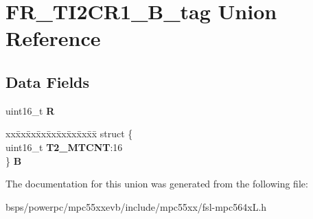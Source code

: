 \hypertarget{unionFR__TI2CR1__16B__tag}{}\section{F\+R\+\_\+\+T\+I2\+C\+R1\+\_\+B\+\_\+tag Union Reference}
\label{unionFR__TI2CR1__16B__tag}
\subsection*{Data Fields}
\begin{DoxyCompactItemize}
\item 
\mbox{\label{unionFR__TI2CR1__16B__tag_a9ae1f811157293cf4ed5969af08a7f9a}} 
uint16\+\_\+t {\bfseries R}
\item 
\mbox{\label{unionFR__TI2CR1__16B__tag_a94ff2b526fd749aef91951b9b343eaff}} 
\begin{tabbing}
xx\=xx\=xx\=xx\=xx\=xx\=xx\=xx\=xx\=\kill
struct \{\\
\>uint16\_t {\bfseries T2\_MTCNT}:16\\
\} {\bfseries B}\\

\end{tabbing}\end{DoxyCompactItemize}


The documentation for this union was generated from the following file\+:\begin{DoxyCompactItemize}
\item 
bsps/powerpc/mpc55xxevb/include/mpc55xx/fsl-\/mpc564x\+L.\+h\end{DoxyCompactItemize}
